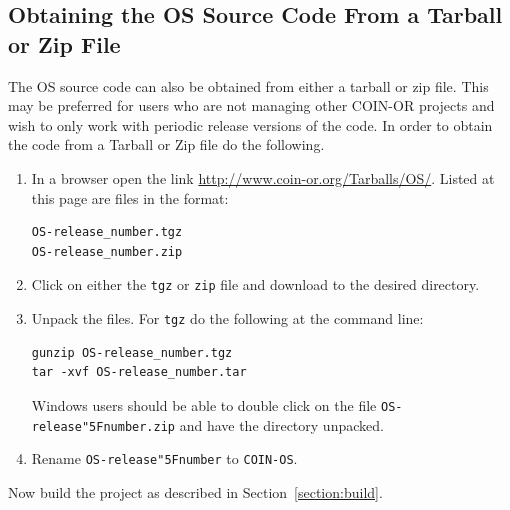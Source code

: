 \documentclass[11pt]{article}
\renewcommand{\_}{{\char"5F}}
\renewcommand{\{}{{\char"7B}}
\renewcommand{\}}{{\char"7D}}
\renewcommand{\^}{{\char"0D}}
\renewcommand{\'}{{\char"0D}}
\begin{document}
\subsection{Obtaining the OS Source Code From a Tarball or Zip File}\label{section:getTarBalls}

The OS source code can also be obtained from either a  tarball or 
zip file.  This may be preferred for users who are not managing other 
COIN-OR projects and wish to only work with periodic release versions of the code.  In order to obtain the code 
from a Tarball or Zip file do the following.

\vskip 8pt

\begin{enumerate}[{\bf Step 1:}]

\item{}
In a browser open the link \url{http://www.coin-or.org/Tarballs/OS/}.  Listed at this page are files in the format:

\begin{verbatim}
OS-release_number.tgz
OS-release_number.zip
\end{verbatim}

\vskip 8pt

\item{}
Click on either the {\tt tgz} or {\tt zip} file and download to the desired directory.

\vskip 8pt

\item{}
Unpack the files. For {\tt tgz} do the following at the command line:
\begin{verbatim}
gunzip OS-release_number.tgz
tar -xvf OS-release_number.tar
\end{verbatim}

Windows users should be  able to double click on the file {\tt OS-release\_number.zip} and have the directory unpacked.

\vskip 8pt

\item{}
Rename {\tt OS-release\_number} to {\tt COIN-OS}.
\end{enumerate}


Now build the project as described in  Section~\ref{section:build}.
\end{document}
